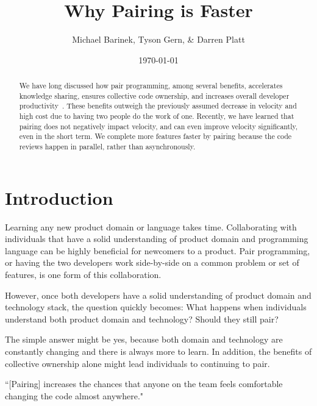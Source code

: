 \documentclass[letterpaper]{article}
\title{Why Pairing is Faster}
\author{Michael Barinek, Tyson Gern, \& Darren Platt}
\date{\today}
\theoremstyle{definition}
\begin{document}
    \maketitle

    \begin{abstract}
        We have long discussed how pair programming, among several benefits, accelerates knowledge sharing, ensures
        collective code ownership, and increases overall developer productivity~\cite{fowler:pairing}.
        These benefits outweigh the previously assumed decrease in velocity and high cost due to having two people do
        the work of one.
        Recently, we have learned that pairing does not negatively impact velocity, and can even improve velocity
        significantly, even in the short term.
        We complete more features faster by pairing because the code reviews happen in parallel, rather than asynchronously.
    \end{abstract}


    \section{Introduction}\label{sec:introduction}

    Learning any new product domain or language takes time.
    Collaborating with individuals that have a solid understanding of product domain and programming language can be
    highly beneficial for newcomers to a product.
    Pair programming, or having the two developers work side-by-side on a common problem or set of features, is one form
    of this collaboration.

    However, once both developers have a solid understanding of product domain and technology stack, the question
    quickly becomes: What happens when individuals understand both product domain and technology?
    Should they still pair?

    The simple answer might be yes, because both domain and technology are constantly changing and there is always more
    to learn.
    In addition, the benefits of collective ownership alone might lead individuals to continuing to pair.

    \begin{displayquote}
        ``[Pairing] increases the chances that anyone on the team feels comfortable changing the code almost anywhere."
    \end{displayquote}
\end{document}

